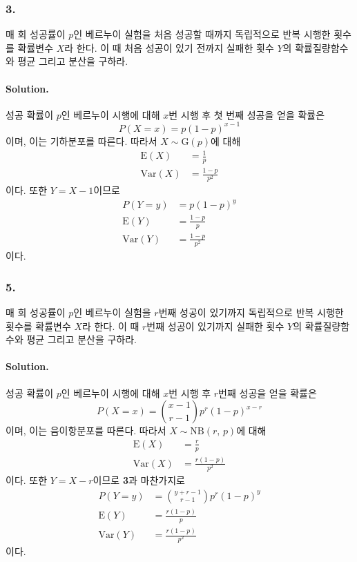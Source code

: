 \subsubsection{3.} 매 회 성공률이 $p$인 베르누이 실험을 처음 성공할 때까지 독립적으로 반복 시행한 횟수를 확률변수 $X$라 한다. 이 때 처음 성공이 있기 전까지 실패한 횟수
$Y$의 확률질량함수와 평균 그리고 분산을 구하라.

\paragraph{Solution.} 성공 확률이 $p$인 베르누이 시행에 대해 $x$번 시행 후 첫 번째 성공을 얻을 확률은
\[P\left(X=x\right) = p\left(1 - p\right)^{x - 1}\]
이며, 이는 기하분포를 따른다. 따라서 $X\sim\mathrm{G}\left(p\right)$에 대해
\begin{align*}
    \mathrm{E}\left(X\right) &= \frac{1}{p}\\
    \mathrm{Var}\left(X\right) &= \frac{1-p}{p^2}
\end{align*}
이다. 또한 $Y = X - 1$이므로
\begin{align*}
    P\left(Y=y\right) &= p\left(1 - p\right)^y\\
    \mathrm{E}\left(Y\right) &= \frac{1-p}{p}\\
    \mathrm{Var}\left(Y\right) &= \frac{1-p}{p^2}
\end{align*}
이다.

\subsubsection{5.} 매 회 성공률이 $p$인 베르누이 실험을 $r$번째 성공이 있기까지 독립적으로 반복 시행한 횟수를 확률변수 $X$라 한다. 이 때 $r$번째 성공이 있기까지 실패한 횟수
$Y$의 확률질량함수와 평균 그리고 분산을 구하라.

\paragraph{Solution.} 성공 확률이 $p$인 베르누이 시행에 대해 $x$번 시행 후 $r$번째 성공을 얻을 확률은
\[P\left(X=x\right) = \binom{x-1}{r-1}p^r\left(1 - p\right)^{x-r}\]
이며, 이는 음이항분포를 따른다. 따라서 $X\sim\mathrm{NB}\left(r,\,p\right)$에 대해
\begin{align*}
    \mathrm{E}\left(X\right) &= \frac{r}{p}\\
    \mathrm{Var}\left(X\right) &= \frac{r\left(1-p\right)}{p^2}
\end{align*}
이다. 또한 $Y = X - r$이므로 \textbf{3}과 마찬가지로
\begin{align*}
    P\left(Y=y\right) &= \binom{y+r-1}{r-1}p^r\left(1 - p\right)^y \\
    \mathrm{E}\left(Y\right) &= \frac{r\left(1-p\right)}{p}\\
    \mathrm{Var}\left(Y\right) &= \frac{r\left(1-p\right)}{p^2}
\end{align*}
이다.

